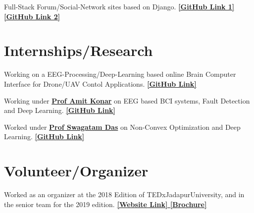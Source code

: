 \documentclass[]{deedy-resume-openfont}
\begin{document}
\begin{minipage}[t]{0.66\textwidth}
Full-Stack Forum/Social-Network sites based on Django.
\textbf{\href{https://github.com/AyanSinhaMahapatra/Univnet_Beta}{ [GitHub Link 1] }} \textbf{\href{https://github.com/AyanSinhaMahapatra/AnswerIt}{ [GitHub Link 2] }}
\sectionsep


\section{Internships/Research}
Working on a EEG-Processing/Deep-Learning based online Brain Computer Interface for Drone/UAV Contol Applications. 
\textbf{\href{https://github.com/AyanSinhaMahapatra/bci-nal}{ [GitHub Link] }}
\sectionsep

Working under \textbf{\href{https://www.amitkonar.com/}{Prof Amit Konar}} on EEG based BCI systems, Fault Detection and Deep Learning.  
\textbf{\href{https://github.com/AyanSinhaMahapatra/FaultDetectionProjects}{ [GitHub Link] }}
\sectionsep

Worked under \textbf{\href{https://www.isical.ac.in/~swagatam.das/}{Prof Swagatam Das}} on Non-Convex Optimization and Deep Learning.
\textbf{\href{https://github.com/AyanSinhaMahapatra/Gene_Algos}{ [GitHub Link] }}


\section{Volunteer/Organizer}
Worked as an organizer at the 2018 Edition of TEDxJadapurUniversity, and in the senior team for the 2019 edition.  
\textbf{\href{https://tedxjadavpuruniversity.com/}{ [Website Link] }}
\textbf{\href{https://tedxjadavpuruniversity.com/assets/Brochure.pdf}{ [Brochure] }}
\sectionsep

\end{minipage} 
\end{document}
